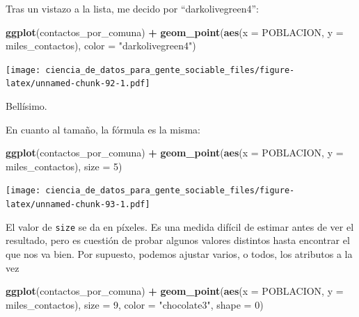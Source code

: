 \documentclass[spanish,]{book}
\newenvironment{Shaded}{\begin{snugshade}}{\end{snugshade}}
\newcommand{\DataTypeTok}[1]{\textcolor[rgb]{0.13,0.29,0.53}{#1}}
\newcommand{\DecValTok}[1]{\textcolor[rgb]{0.00,0.00,0.81}{#1}}
\newcommand{\KeywordTok}[1]{\textcolor[rgb]{0.13,0.29,0.53}{\textbf{#1}}}
\newcommand{\NormalTok}[1]{#1}
\newcommand{\OperatorTok}[1]{\textcolor[rgb]{0.81,0.36,0.00}{\textbf{#1}}}
\newcommand{\StringTok}[1]{\textcolor[rgb]{0.31,0.60,0.02}{#1}}
\begin{document}
Tras un vistazo a la lista, me decido por ``darkolivegreen4'':

\begin{Shaded}
\begin{Highlighting}[]
\KeywordTok{ggplot}\NormalTok{(contactos_por_comuna) }\OperatorTok{+}\StringTok{ }
\StringTok{    }\KeywordTok{geom_point}\NormalTok{(}\KeywordTok{aes}\NormalTok{(}\DataTypeTok{x =}\NormalTok{ POBLACION, }\DataTypeTok{y =}\NormalTok{ miles_contactos), }\DataTypeTok{color =} \StringTok{"darkolivegreen4"}\NormalTok{)}
\end{Highlighting}
\end{Shaded}

\texttt{[image: ciencia\_de\_datos\_para\_gente\_sociable\_files/figure-latex/unnamed-chunk-92-1.pdf]}

Bellísimo.

En cuanto al tamaño, la fórmula es la misma:

\begin{Shaded}
\begin{Highlighting}[]
\KeywordTok{ggplot}\NormalTok{(contactos_por_comuna) }\OperatorTok{+}\StringTok{ }
\StringTok{    }\KeywordTok{geom_point}\NormalTok{(}\KeywordTok{aes}\NormalTok{(}\DataTypeTok{x =}\NormalTok{ POBLACION, }\DataTypeTok{y =}\NormalTok{ miles_contactos), }\DataTypeTok{size =} \DecValTok{5}\NormalTok{)}
\end{Highlighting}
\end{Shaded}

\texttt{[image: ciencia\_de\_datos\_para\_gente\_sociable\_files/figure-latex/unnamed-chunk-93-1.pdf]}

El valor de \texttt{size} se da en píxeles. Es una medida difícil de estimar antes de ver el resultado, pero es cuestión de probar algunos valores distintos hasta encontrar el que nos va bien. Por supuesto, podemos ajustar varios, o todos, los atributos a la vez

\begin{Shaded}
\begin{Highlighting}[]
\KeywordTok{ggplot}\NormalTok{(contactos_por_comuna) }\OperatorTok{+}\StringTok{ }
\StringTok{    }\KeywordTok{geom_point}\NormalTok{(}\KeywordTok{aes}\NormalTok{(}\DataTypeTok{x =}\NormalTok{ POBLACION, }\DataTypeTok{y =}\NormalTok{ miles_contactos), }
               \DataTypeTok{size =} \DecValTok{9}\NormalTok{, }\DataTypeTok{color =} \StringTok{"chocolate3"}\NormalTok{, }\DataTypeTok{shape =} \DecValTok{0}\NormalTok{)}
\end{Highlighting}
\end{Shaded}
\end{document}
